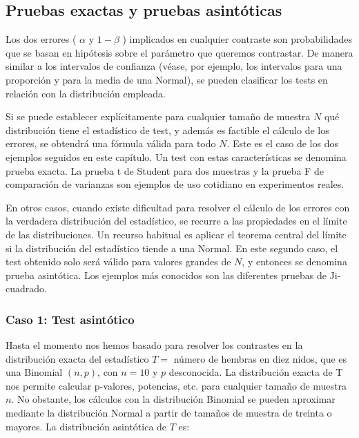 \documentclass[
]{article}
\begin{document}
\subsection{Pruebas exactas y pruebas asintóticas}\label{pruebas-exactas-y-pruebas-asintuxf3ticas}

Los dos errores ( \(\alpha\) y \(1-\beta\) ) implicados en cualquier contraste son probabilidades que se basan en hipótesis sobre el parámetro que queremos contrastar. De manera similar a los intervalos de confianza (véase, por ejemplo, los intervalos para una proporción y para la media de una Normal), se pueden clasificar los tests en relación con la distribución empleada.

Si se puede establecer explícitamente para cualquier tamaño de muestra \(N\) qué distribución tiene el estadístico de test, y además es factible el cálculo de los errores, se obtendrá una fórmula válida para todo \(N\). Este es el caso de los dos ejemplos seguidos en este capítulo. Un test con estas características se denomina prueba exacta. La prueba t de Student para dos muestras y la prueba F de comparación de varianzas son ejemplos de uso cotidiano en experimentos reales.

En otros casos, cuando existe dificultad para resolver el cálculo de los errores con la verdadera distribución del estadístico, se recurre a las propiedades en el límite de las distribuciones. Un recurso habitual es aplicar el teorema central del límite si la distribución del estadístico tiende a una Normal. En este segundo caso, el test obtenido solo será válido para valores grandes de \(N\), y entonces se denomina prueba asintótica. Los ejemplos más conocidos son las diferentes pruebas de Ji-cuadrado.

\subsubsection{Caso 1: Test asintótico}\label{caso-1-test-asintuxf3tico}

Hasta el momento nos hemos basado para resolver los contrastes en la distribución exacta del estadístico \(T=\) número de hembras en diez nidos, que es una Binomial \((n, p)\), con \(n=10\) y \(p\) desconocida. La distribución exacta de T nos permite calcular p-valores, potencias, etc. para cualquier tamaño de muestra \(n\). No obstante, los cálculos con la distribución Binomial se pueden aproximar mediante la distribución Normal a partir de tamaños de muestra de treinta o mayores. La distribución asintótica de \(T\) es:
\end{document}
